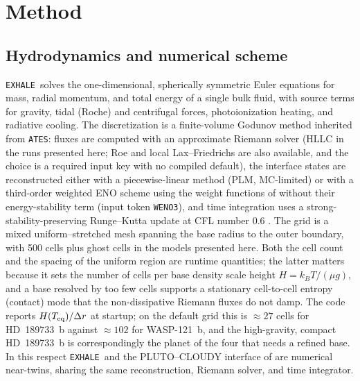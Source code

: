 \documentclass[twocolumn]{aastex702}
\newcommand{\EXHALE}{\texttt{EXHALE}}
\newcommand{\ATES}{\texttt{ATES}}
\begin{document}
\section{Method}
\label{sec:method}

\subsection{Hydrodynamics and numerical scheme}
\label{sec:hydro}

\EXHALE\ solves the one-dimensional, spherically symmetric Euler equations for mass,
radial momentum, and total energy of a single bulk fluid, with source terms for gravity,
tidal (Roche) and centrifugal forces, photoionization heating, and radiative cooling.
The discretization is a finite-volume Godunov method inherited from \ATES: fluxes are
computed with an approximate Riemann solver (HLLC in the runs presented here; Roe and local
Lax--Friedrichs are also available, and the choice is a required input key with no compiled
default), the interface states are reconstructed either with a piecewise-linear method
(PLM, MC-limited) or with a third-order weighted ENO scheme using the weight
functions of \citet{Yamaleev2009} without their energy-stability term
(input token \texttt{WENO3}), and time integration uses a strong-stability-preserving
Runge--Kutta update at CFL number $0.6$ \citep{Caldiroli2021,Salz2016}. The grid is a
mixed uniform--stretched mesh spanning the base radius to the outer boundary, with 500
cells plus ghost cells in the models presented here. Both the cell count and the
spacing of the uniform region are runtime quantities; the latter matters because it sets
the number of cells per base density scale height $H=k_BT/(\mu g)$, and a base resolved by
too few cells supports a stationary cell-to-cell entropy (contact) mode that the
non-dissipative Riemann fluxes do not damp. The code reports $H(T_{\rm eq})/\Delta r$ at
startup; on the default grid this is $\approx27$ cells for HD~189733~b against
$\approx102$ for WASP-121~b, and the high-gravity, compact HD~189733~b is correspondingly
the planet of the four that needs a refined base. In this respect \EXHALE\ and the
PLUTO--CLOUDY interface of
\citet{Salz2016} are numerical near-twins, sharing the same reconstruction, Riemann
solver, and time integrator.
\end{document}
